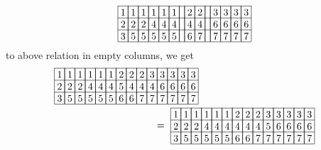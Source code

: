 {\begin{align*}
{\def\lr#1{\multicolumn{1}{|@{\hspace{.6ex}}c@{\hspace{.6ex}}|}{\raisebox{-.3ex}{$#1$}}}
\raisebox{-.6ex}{$\begin{array}[c]{*{14}c}\cline{1-14}
\lr{1}&\lr{1}&\lr{1}&\lr{1}&\lr{1}&\lr{1}&\lr{}&\lr{2}&\lr{2}&\lr{}&\lr{3}&\lr{3}&\lr{3}&\lr{3}\\\cline{1-14}
\lr{2}&\lr{2}&\lr{2}&\lr{4}&\lr{4}&\lr{4}&\lr{}&\lr{4}&\lr{4}&\lr{}&\lr{6}&\lr{6}&\lr{6}&\lr{6}\\\cline{1-14}
\lr{3}&\lr{5}&\lr{5}&\lr{5}&\lr{5}&\lr{5}&\lr{}&\lr{6}&\lr{7}&\lr{}&\lr{7}&\lr{7}&\lr{7}&\lr{7}\\\cline{1-14}
\end{array}$}
}
\end{align*}
to above relation in empty columns, we get 
\begin{align*}
&{\def\lr#1{\multicolumn{1}{|@{\hspace{.6ex}}c@{\hspace{.6ex}}|}{\raisebox{-.3ex}{$#1$}}}
\raisebox{-.6ex}{$\begin{array}[c]{*{14}c}\cline{1-14}
\lr{1}&\lr{1}&\lr{1}&\lr{1}&\lr{1}&\lr{1}&\lr{2}&\lr{2}&\lr{2}&\lr{3}&\lr{3}&\lr{3}&\lr{3}&\lr{3}\\\cline{1-14}
\lr{2}&\lr{2}&\lr{2}&\lr{4}&\lr{4}&\lr{4}&\lr{5}&\lr{4}&\lr{4}&\lr{4}&\lr{6}&\lr{6}&\lr{6}&\lr{6}\\\cline{1-14}
\lr{3}&\lr{5}&\lr{5}&\lr{5}&\lr{5}&\lr{5}&\lr{6}&\lr{6}&\lr{7}&\lr{7}&\lr{7}&\lr{7}&\lr{7}&\lr{7}\\\cline{1-14}
\end{array}$}
}\\
&\hspace{100pt}
{\def\lr#1{\multicolumn{1}{|@{\hspace{.6ex}}c@{\hspace{.6ex}}|}{\raisebox{-.3ex}{$#1$}}}
\raisebox{-.6ex}{$\ =\ \begin{array}[c]{*{14}c}\cline{1-14}
\lr{1}&\lr{1}&\lr{1}&\lr{1}&\lr{1}&\lr{1}&\lr{2}&\lr{2}&\lr{2}&\lr{3}&\lr{3}&\lr{3}&\lr{3}&\lr{3}\\\cline{1-14}
\lr{2}&\lr{2}&\lr{2}&\lr{4}&\lr{4}&\lr{4}&\lr{4}&\lr{4}&\lr{4}&\lr{5}&\lr{6}&\lr{6}&\lr{6}&\lr{6}\\\cline{1-14}
\lr{3}&\lr{5}&\lr{5}&\lr{5}&\lr{5}&\lr{5}&\lr{6}&\lr{6}&\lr{7}&\lr{7}&\lr{7}&\lr{7}&\lr{7}&\lr{7}\\\cline{1-14}
\end{array}$}
}
\end{align*}}

